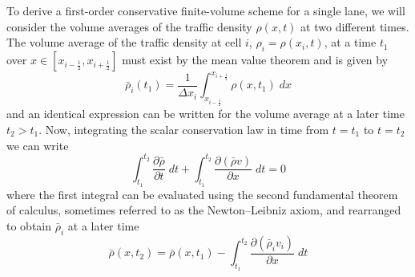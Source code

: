 \documentclass[11pt]{article}
\begin{document}
To derive a first-order conservative finite-volume scheme for a single lane, we will consider the volume averages of the traffic density $\rho(x,t)$ at two different times. The volume average of the traffic density at cell $i$, $\rho_i = \rho(x_i,t)$, at a time $t_1$ over $x \in \left[ x_{i-\frac{1}{2}}, x_{i+\frac{1}{2}} \right]$ must exist by the mean value theorem and is given by
\begin{equation*}
	\bar{\rho}_i(t_1) = \frac{1}{\Delta x_i} \int_{x_{i-\frac{1}{2}}}^{x_{i+\frac{1}{2}}} \rho(x,t_1) \; dx
\end{equation*}
and an identical expression can be written for the volume average at a later time $t_2 > t_1$. Now, integrating the scalar conservation law in time from $t = t_1$ to $t = t_2$ we can write
\begin{equation*}
	\int_{t_1}^{t_2} \frac{\partial\bar{\rho}}{\partial t} \; dt + \int_{t_1}^{t_2} \frac{\partial(\bar{\rho} v)}{\partial x} \; dt = 0
\end{equation*}                         
where the first integral can be evaluated using the second fundamental theorem of calculus, sometimes referred to as the Newton–Leibniz axiom, and rearranged to obtain $\bar{\rho}_i$ at a later time
\begin{equation*}
\bar{\rho}(x,t_2) = \bar{\rho}(x,t_1) - \int_{t_1}^{t_2} \frac{\partial(\bar{\rho}_i v_i)}{\partial x} \; dt
\end{equation*}
\end{document}

